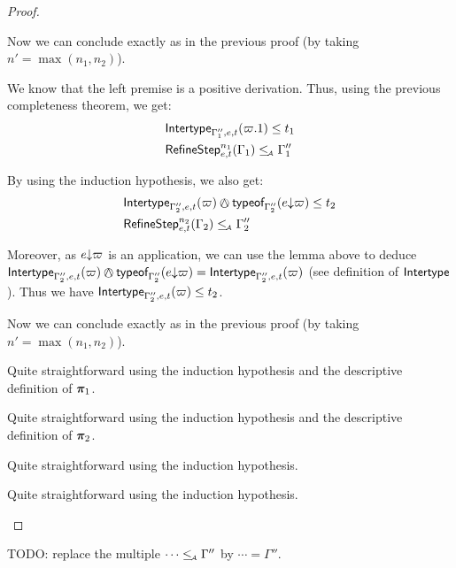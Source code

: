 \documentclass[a4paper]{article}
\theoremstyle{definition}
\begin{document}
\begin{proof}
\begin{description}
\begin{description}
        Now we can conclude exactly as in the previous proof (by taking $n'=\max (n_1,n_2)$).

        \item[\Rule{PAppL}] We know that the left premise is a positive derivation.
        Thus, using the previous completeness theorem, we get:
        \begin{align*}
          &\textsf{Intertype}_{\Gamma_1'',e,t} (\varpi.1) \leq t_1\\
          &\textsf{RefineStep}_{e,t}^{n_1} (\Gamma_1) \leq_{\!\scriptscriptstyle\mathcal{A}} \Gamma_1''
        \end{align*}

        By using the induction hypothesis, we also get:
        \begin{align*}
          &\env {\Gamma_2'',e,t} (\varpi) \tsand \tyof {\occ e {\varpi}} {\Gamma_2''} \leq t_2\\
          &\RefineStep {e,t}^{n_2} (\Gamma_2) \leqA \Gamma_2''
        \end{align*}

        Moreover, as $e{\downarrow}\varpi$ is an application, we can use the lemma above to deduce
        $\env {\Gamma_2'',e,t} (\varpi) \tsand \tyof {\occ e {\varpi}} {\Gamma_2''} = \env {\Gamma_2'',e,t} (\varpi)$
        (see definition of $\textsf{Intertype}_{}$).
        Thus we have $\textsf{Intertype}_{\Gamma_2'',e,t} (\varpi) \leq t_2$.

        Now we can conclude exactly as in the previous proof (by taking $n'=\max (n_1,n_2)$).
        \item[\Rule{PPairL}] Quite straightforward using the induction hypothesis and the descriptive definition of $\boldsymbol{\pi}_1$.
        \item[\Rule{PPairR}] Quite straightforward using the induction hypothesis and the descriptive definition of $\boldsymbol{\pi}_2$.
        \item[\Rule{PFst}] Quite straightforward using the induction hypothesis.
        \item[\Rule{PSnd}] Quite straightforward using the induction hypothesis.
      \end{description}
    \end{description}
  \end{proof}

TODO: replace the multiple $\cdots \leq_{\!\scriptscriptstyle\mathcal{A}} \Gamma''$ by $\cdots = \Gamma''$.
\end{document}
